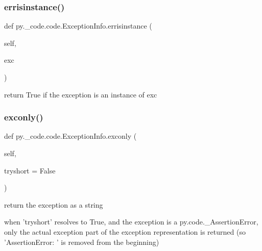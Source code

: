 \subsubsection{\texorpdfstring{errisinstance()}{errisinstance()}}
{\footnotesize\ttfamily def py.\+\_\+code.\+code.\+Exception\+Info.\+errisinstance (\begin{DoxyParamCaption}\item[{}]{self,  }\item[{}]{exc }\end{DoxyParamCaption})}

\begin{DoxyVerb}return True if the exception is an instance of exc \end{DoxyVerb}
 \mbox{\label{classpy_1_1__code_1_1code_1_1_exception_info_ab69ed52d921c39d1bd51c3503c9ada42}} 
\subsubsection{\texorpdfstring{exconly()}{exconly()}}
{\footnotesize\ttfamily def py.\+\_\+code.\+code.\+Exception\+Info.\+exconly (\begin{DoxyParamCaption}\item[{}]{self,  }\item[{}]{tryshort = {\ttfamily False} }\end{DoxyParamCaption})}

\begin{DoxyVerb}return the exception as a string

    when 'tryshort' resolves to True, and the exception is a
    py.code._AssertionError, only the actual exception part of
    the exception representation is returned (so 'AssertionError: ' is
    removed from the beginning)
\end{DoxyVerb}
 \mbox{\label{classpy_1_1__code_1_1code_1_1_exception_info_a57953e48c7a0f5109f4628fb6746a36d}} 
